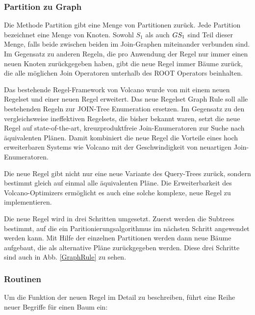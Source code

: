 \subsubsection{Partition zu Graph}



Die Methode Partition gibt eine Menge von Partitionen zurück. Jede Partition bezeichnet eine Menge von Knoten. Sowohl $S_1$ als auch $G\\S_1$ sind Teil dieser Menge, falls beide zwischen beiden im Join-Graphen miteinander verbunden sind. Im Gegensatz zu anderen Regeln, die pro Anwendung der Regel nur immer einen neuen Knoten zurückgegeben haben, gibt die neue Regel immer Bäume zurück, die alle möglichen Join Operatoren unterhalb des ROOT Operators beinhalten.





Das bestehende Regel-Framework von Volcano wurde von \cite{shanbhag2014optimizing} mit einem neuen Regelset und einer neuen Regel erweitert. Das neue Regelset Graph Rule soll alle bestehenden Regeln zur JOIN-Tree Enumeration ersetzen. Im Gegensatz zu den vergleichsweise ineffektiven Regelsets, die bisher bekannt waren, setzt die neue Regel auf state-of-the-art, kreuzproduktfreie Join-Enumeratoren zur Suche nach äquivalenten Plänen. Damit kombiniert die neue Regel die Vorteile eines hoch erweiterbaren Systems wie Volcano mit der Geschwindigkeit von neuartigen Join-Enumeratoren.

Die neue Regel gibt nicht nur eine neue Variante des Query-Trees zurück, sondern bestimmt gleich auf einmal alle äquivalenten Pläne. Die Erweiterbarkeit des Volcano-Optimizers ermöglicht es auch eine solche komplexe, neue Regel zu implementieren.

Die neue Regel wird in drei Schritten umgesetzt. Zuerst werden die Subtrees bestimmt, auf die ein Paritionierungsalgorithmus im nächsten Schritt angewendet werden kann. Mit Hilfe der einzelnen Partitionen werden dann neue Bäume aufgebaut, die als alternative Pläne zurückgegeben werden. Diese drei Schritte sind auch in Abb. \ref{GraphRule} zu sehen.

\subsubsection{Routinen}





Um die Funktion der neuen Regel im Detail zu beschreiben, führt \cite{shanbhag2014optimizing} eine Reihe neuer Begriffe für einen Baum ein:

